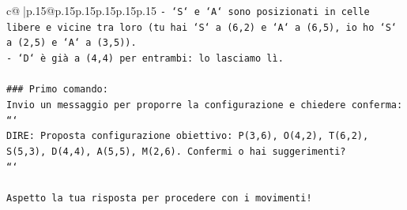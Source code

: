 \documentclass{article}
\begin{document}
{\begin{supertabular}{c@{$\;$}|p{.15\linewidth}@{}p{.15\linewidth}p{.15\linewidth}p{.15\linewidth}p{.15\linewidth}p{.15\linewidth}}
{{{\texttt{{-} `S` e `A` sono posizionati in celle libere e vicine tra loro (tu hai `S` a (6,2) e `A` a (6,5), io ho `S` a (2,5) e `A` a (3,5)).} \\
\texttt{{-} `D` è già a (4,4) per entrambi: lo lasciamo lì.} \\
\\ 
\texttt{\#\#\# Primo comando:} \\
\texttt{Invio un messaggio per proporre la configurazione e chiedere conferma:} \\
\texttt{```} \\
\texttt{DIRE: Proposta configurazione obiettivo: P(3,6), O(4,2), T(6,2), S(5,3), D(4,4), A(5,5), M(2,6). Confermi o hai suggerimenti?} \\
\texttt{```} \\
\\ 
\texttt{Aspetto la tua risposta per procedere con i movimenti!} \\
            }
        }
    }
     \\ \\


\end{supertabular}}
\end{document}

